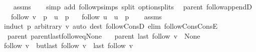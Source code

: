 \begin{isabellebody}
\ \ %
\endisadelimproof
%
\isatagproof
{}\isamarkupfalse%
\ assms\isanewline
\ \ \isamarkupfalse%
\ {\isacharparenleft}{\kern0pt}simp\ add{\isacharcolon}{\kern0pt}\ follow{\isacharunderscore}{\kern0pt}psimps\ split{\isacharcolon}{\kern0pt}\ option{\isachardot}{\kern0pt}splits{\isacharparenleft}{\kern0pt}{}{\isacharparenright}{\kern0pt}{\isacharparenright}{\kern0pt}%
\endisatagproof
{\isafoldproof}%
%
\isadelimproof
\isanewline
%
\endisadelimproof
\isanewline
{}\isamarkupfalse%
\ {\isacharparenleft}{\kern0pt}\ parent{\isacharparenright}{\kern0pt}\ follow{\isacharunderscore}{\kern0pt}appendD{\isacharcolon}{\kern0pt}\isanewline
\ \ \ {\isachardoublequoteopen}follow\ v\ {\isacharequal}{\kern0pt}\ p\ {\isacharat}{\kern0pt}\ u\ {\isacharhash}{\kern0pt}\ p{\isacharprime}{\kern0pt}{\isachardoublequoteclose}\isanewline
\ \ \ {\isachardoublequoteopen}follow\ u\ {\isacharequal}{\kern0pt}\ u\ {\isacharhash}{\kern0pt}\ p{\isacharprime}{\kern0pt}{\isachardoublequoteclose}\isanewline
%
\isadelimproof
\ \ %
\endisadelimproof
%
\isatagproof
{}\isamarkupfalse%
\ assms\isanewline
\ \ \isamarkupfalse%
\ {\isacharparenleft}{\kern0pt}induct\ p\ arbitrary{\isacharcolon}{\kern0pt}\ v{\isacharparenright}{\kern0pt}\ {\isacharparenleft}{\kern0pt}auto\ dest{\isacharcolon}{\kern0pt}\ follow{\isacharunderscore}{\kern0pt}ConsD\ elim{\isacharcolon}{\kern0pt}\ follow{\isacharunderscore}{\kern0pt}Cons{\isacharunderscore}{\kern0pt}ConsE{\isacharparenright}{\kern0pt}%
\endisatagproof
{\isafoldproof}%
%
\isadelimproof
\isanewline
%
\endisadelimproof
\isanewline
{}\isamarkupfalse%
\ {\isacharparenleft}{\kern0pt}\ parent{\isacharparenright}{\kern0pt}\ parent{\isacharunderscore}{\kern0pt}last{\isacharunderscore}{\kern0pt}follow{\isacharunderscore}{\kern0pt}eq{\isacharunderscore}{\kern0pt}None{\isacharcolon}{\kern0pt}\isanewline
\ \ \ {\isachardoublequoteopen}parent\ {\isacharparenleft}{\kern0pt}last\ {\isacharparenleft}{\kern0pt}follow\ v{\isacharparenright}{\kern0pt}{\isacharparenright}{\kern0pt}\ {\isacharequal}{\kern0pt}\ None{\isachardoublequoteclose}\isanewline
%
\isadelimproof
%
\endisadelimproof
%
\isatagproof
{}\isamarkupfalse%
\ {\isacharminus}{\kern0pt}\isanewline
\ \ \isamarkupfalse%
\ {\isachardoublequoteopen}follow\ v\ {\isacharequal}{\kern0pt}\ butlast\ {\isacharparenleft}{\kern0pt}follow\ v{\isacharparenright}{\kern0pt}\ {\isacharat}{\kern0pt}\ {\isacharbrackleft}{\kern0pt}last\ {\isacharparenleft}{\kern0pt}follow\ v{\isacharparenright}{\kern0pt}{\isacharbrackright}{\kern0pt}{\isachardoublequoteclose}\isanewline

\end{isabellebody}
